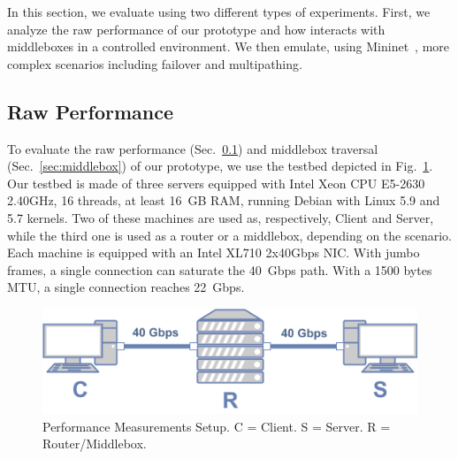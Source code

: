 
In this section, we evaluate \tcpls using two different types of experiments.
First, we analyze the raw performance of our \tcpls prototype and how \tcpls interacts with middleboxes in a controlled environment. We then emulate, using Mininet~\cite{handigol2012reproducible}, more complex scenarios including failover and multipathing.






\subsection{Raw Performance} \label{sec:perf}

To evaluate the raw performance (Sec.~\ref{sec:perf}) and middlebox traversal
(Sec.~\ref{sec:middlebox}) of our \tcpls prototype, we use the testbed depicted in Fig.~\ref{fig:perf_testbed}. Our testbed is made of three servers equipped with Intel Xeon CPU E5-2630 2.40GHz, 16 threads, at least 16~GB RAM, running Debian with Linux 5.9 and 5.7 kernels. Two of these machines are used as, respectively, Client and Server, while the third one is used as a router or a middlebox, depending on the scenario. Each machine is equipped with an Intel XL710 2x40Gbps NIC. With jumbo frames, a single \tcp connection can saturate the 40~Gbps path. With a 1500 bytes MTU, a single connection reaches 22~Gbps.

\begin{figure}[!t]
  \begin{center}
    \includegraphics[width=.6\columnwidth]{figures/testbed.png}
  \end{center}
  \vspace{-0.5cm}
  \caption{Performance Measurements Setup. C = Client. S = Server. R = Router/Middlebox.}
  \label{fig:perf_testbed}
\end{figure}


